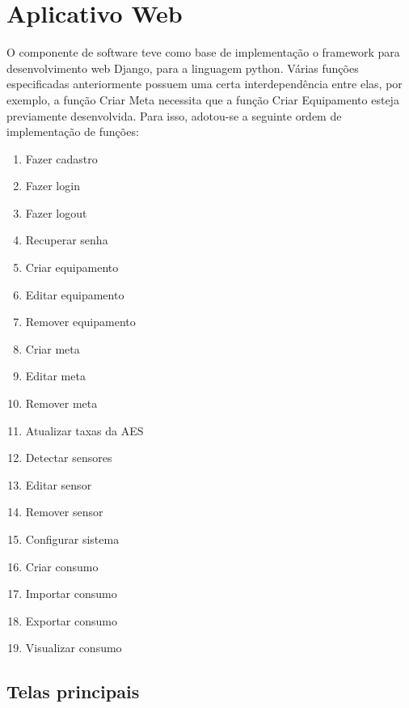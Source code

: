 \section{Aplicativo Web}
\label{Sec:5-aplicativo-web}

O componente de software teve como base de implementação o framework para desenvolvimento web Django, para a linguagem python. Várias funções especificadas anteriormente possuem uma certa interdependência entre elas, por exemplo, a função Criar Meta necessita que a função Criar Equipamento esteja previamente desenvolvida. Para isso, adotou-se a seguinte ordem de implementação de funções:

\begin{enumerate}
	\item{Fazer cadastro}
	\item{Fazer login}
	\item{Fazer logout}
	\item{Recuperar senha}
	\item{Criar equipamento}
	\item{Editar equipamento}
	\item{Remover equipamento}
	\item{Criar meta}
	\item{Editar meta}
	\item{Remover meta}
	\item{Atualizar taxas da AES}
	\item{Detectar sensores}
	\item{Editar sensor}
	\item{Remover sensor}
	\item{Configurar sistema}
	\item{Criar consumo}
	\item{Importar consumo}
	\item{Exportar consumo}
	\item{Visualizar consumo}
\end{enumerate}

\subsection{Telas principais}
